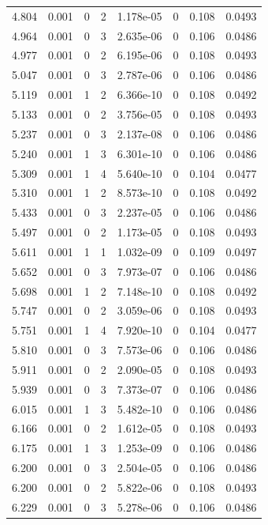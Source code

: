 \documentclass[preview]{standalone}
\begin{document}
{{{\begin{tabular}{L{1.2cm}C{1.2cm} C{0.3cm}C{0.5cm} C{1.4cm}C{1.4cm} C{1.4cm}C{1.4cm}}
  4.804  &  0.001  & 0     &  2 &  1.178e-05  & 0  & 0.108 &  0.0493   \\ 
  4.964  &  0.001  & 0     &  3 &  2.635e-06  & 0  & 0.106 &  0.0486   \\ 
  4.977  &  0.001  & 0     &  2 &  6.195e-06  & 0  & 0.108 &  0.0493   \\ 
  5.047  &  0.001  & 0     &  3 &  2.787e-06  & 0  & 0.106 &  0.0486   \\ 
  5.119  &  0.001  & 1     &  2 &  6.366e-10  & 0  & 0.108 &  0.0492   \\ 
  5.133  &  0.001  & 0     &  2 &  3.756e-05  & 0  & 0.108 &  0.0493   \\ 
  5.237  &  0.001  & 0     &  3 &  2.137e-08  & 0  & 0.106 &  0.0486   \\ 
  5.240  &  0.001  & 1     &  3 &  6.301e-10  & 0  & 0.106 &  0.0486   \\ 
  5.309  &  0.001  & 1     &  4 &  5.640e-10  & 0  & 0.104 &  0.0477   \\ 
  5.310  &  0.001  & 1     &  2 &  8.573e-10  & 0  & 0.108 &  0.0492   \\ 
  5.433  &  0.001  & 0     &  3 &  2.237e-05  & 0  & 0.106 &  0.0486   \\ 
  5.497  &  0.001  & 0     &  2 &  1.173e-05  & 0  & 0.108 &  0.0493   \\ 
  5.611  &  0.001  & 1     &  1 &  1.032e-09  & 0  & 0.109 &  0.0497   \\ 
  5.652  &  0.001  & 0     &  3 &  7.973e-07  & 0  & 0.106 &  0.0486   \\ 
  5.698  &  0.001  & 1     &  2 &  7.148e-10  & 0  & 0.108 &  0.0492   \\ 
  5.747  &  0.001  & 0     &  2 &  3.059e-06  & 0  & 0.108 &  0.0493   \\ 
  5.751  &  0.001  & 1     &  4 &  7.920e-10  & 0  & 0.104 &  0.0477   \\ 
  5.810  &  0.001  & 0     &  3 &  7.573e-06  & 0  & 0.106 &  0.0486   \\ 
  5.911  &  0.001  & 0     &  2 &  2.090e-05  & 0  & 0.108 &  0.0493   \\ 
  5.939  &  0.001  & 0     &  3 &  7.373e-07  & 0  & 0.106 &  0.0486   \\ 
  6.015  &  0.001  & 1     &  3 &  5.482e-10  & 0  & 0.106 &  0.0486   \\ 
  6.166  &  0.001  & 0     &  2 &  1.612e-05  & 0  & 0.108 &  0.0493   \\ 
  6.175  &  0.001  & 1     &  3 &  1.253e-09  & 0  & 0.106 &  0.0486   \\ 
  6.200  &  0.001  & 0     &  3 &  2.504e-05  & 0  & 0.106 &  0.0486   \\ 
  6.200  &  0.001  & 0     &  2 &  5.822e-06  & 0  & 0.108 &  0.0493   \\ 
  6.229  &  0.001  & 0     &  3 &  5.278e-06  & 0  & 0.106 &  0.0486   \\ 
\hline 
\end{tabular} 

}}}
\end{document}

